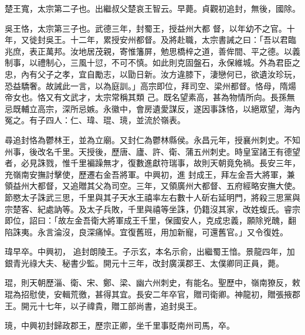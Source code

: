 \begin{pinyinscope}
 楚王寬，太宗第二子也。出繼叔父楚哀王智云。早薨。貞觀初追封，無後，國除。



 吳王恪，太宗第三子也。武德三年，封蜀王，授益州大都
 督，以年幼不之官。十年，又徙封吳王。十二年，累授安州都督。及將赴職，太宗書誡之曰：「吾以君臨兆庶，表正萬邦。汝地居茂親，寄惟籓屏，勉思橋梓之道，善侔間、平之德。以義制事，以禮制心，三風十愆，不可不慎。如此則克固盤石，永保維城。外為君臣之忠，內有父子之孝，宜自勵志，以勖日新。汝方違膝下，淒戀何已，欲遺汝珍玩，恐益驕奢。故誡此一言，以為庭訓。」高宗即位，拜司空、梁州都督。恪母，隋煬帝女也。恪又有文武才，太宗常稱其類
 己。既名望素高，甚為物情所向。長孫無忌既輔立高宗，深所忌嫉。永徽中，會房遺愛謀反，遂因事誅恪，以絕眾望，海內冤之。有子四人：仁、瑋、琨、璄，並流於嶺表。



 尋追封恪為鬱林王，並為立廟。又封仁為鬱林縣侯。永昌元年，授襄州刺史。不知州事，後改名千里。天授後，歷唐、廬、許、衛、蒲五州刺史。時皇室諸王有德望者，必見誅戮，惟千里褊躁無才，復數進獻符瑞事，故則天朝竟免禍。長安三年，充嶺南安撫討擊使，歷遷右金吾將軍。中興初，進
 封成王，拜左金吾大將軍，兼領益州大都督，又追贈其父為司空。三年，又領廣州大都督、五府經略安撫大使。節愍太子誅武三思，千里與其子天水王禧率左右數十人斫右延明門，將殺三思黨與宗楚客、紀處訥等。及太子兵敗，千里與禧等坐誅，仍籍沒其家，改姓蝮氏。睿宗即位，詔曰：「故左金吾衛大將軍成王千里，保國安人，克成忠義，願除兇醜，翻陷誅夷。永言淪沒，良深痛悼。宜復舊班，用加新寵，可還舊官。」又令復姓。



 瑋早卒。中興初，
 追封朗陵王。子示玄，本名示俞，出繼蜀王愔。景龍四年，加銀青光祿大夫、秘書少監。開元十三年，改封廣漢郡王、太僕卿同正員，薨。



 琨，則天朝歷淄、衛、宋、鄭、梁、幽六州刺史，有能名。聖歷中，嶺南獠反，敕琨為招慰使，安輯荒徼，甚得其宜。長安二年卒官，贈司衛卿。神龍初，贈張掖郡王。開元十七年，以子禕貴，贈工部尚書，追封吳王。



 璄，中興初封歸政郡王，歷宗正卿，坐千里事貶南州司馬，卒。




\end{pinyinscope}
